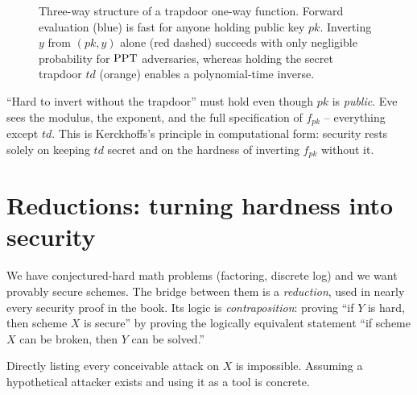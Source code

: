 \begin{figure}[htbp]
\caption{Three-way structure of a trapdoor one-way function. Forward evaluation (blue) is fast for anyone holding public key $pk$. Inverting $y$ from $(pk, y)$ alone (red dashed) succeeds with only negligible probability for $\mathrm{PPT}$ adversaries, whereas holding the secret trapdoor $td$ (orange) enables a polynomial-time inverse.}
\label{ch08:fig-trapdoor}
\end{figure}

\begin{trapbox}
``Hard to invert without the trapdoor'' must hold even though $pk$ is \emph{public}. Eve sees the modulus, the exponent, and the full specification of $f_{pk}$ -- everything except $td$. This is Kerckhoffs's principle in computational form: security rests solely on keeping $td$ secret and on the hardness of inverting $f_{pk}$ without it.
\end{trapbox}

\section{Reductions: turning hardness into security}
\label{ch08:reductions}

We have conjectured-hard math problems (factoring, discrete log) and we want provably secure schemes. The bridge between them is a \emph{reduction}, used in nearly every security proof in the book. Its logic is \emph{contraposition}: proving ``if $Y$ is hard, then scheme $X$ is secure'' by proving the logically equivalent statement ``if scheme $X$ can be broken, then $Y$ can be solved.''

Directly listing every conceivable attack on $X$ is impossible. Assuming a hypothetical attacker exists and using it as a tool is concrete.

